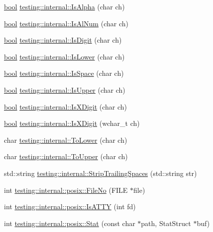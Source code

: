 \begin{DoxyCompactItemize}
\item 
\hyperlink{classbool}{bool} \hyperlink{namespacetesting_1_1internal_aeb957087fd6bbf9db98ab7cd41b0c129}{testing\+::internal\+::\+Is\+Alpha} (char ch)
\item 
\hyperlink{classbool}{bool} \hyperlink{namespacetesting_1_1internal_a83802e7f23324cd512232203662e1a98}{testing\+::internal\+::\+Is\+Al\+Num} (char ch)
\item 
\hyperlink{classbool}{bool} \hyperlink{namespacetesting_1_1internal_a4bd96b7fa6486802d33ddc217af55a39}{testing\+::internal\+::\+Is\+Digit} (char ch)
\item 
\hyperlink{classbool}{bool} \hyperlink{namespacetesting_1_1internal_ac26ce3883bc8919c27074975e958f3b7}{testing\+::internal\+::\+Is\+Lower} (char ch)
\item 
\hyperlink{classbool}{bool} \hyperlink{namespacetesting_1_1internal_af429e04f70f9c10f6aa76a5d1ccd389f}{testing\+::internal\+::\+Is\+Space} (char ch)
\item 
\hyperlink{classbool}{bool} \hyperlink{namespacetesting_1_1internal_a84f3baa379fec6bf5947cb5165aa8cc9}{testing\+::internal\+::\+Is\+Upper} (char ch)
\item 
\hyperlink{classbool}{bool} \hyperlink{namespacetesting_1_1internal_aa234ef141278263fb143b616c74c86e7}{testing\+::internal\+::\+Is\+X\+Digit} (char ch)
\item 
\hyperlink{classbool}{bool} \hyperlink{namespacetesting_1_1internal_a6ab68a30f8291c09b2289c132bbe3b16}{testing\+::internal\+::\+Is\+X\+Digit} (wchar\+\_\+t ch)
\item 
char \hyperlink{namespacetesting_1_1internal_ad9c627ef2a94245e3fd69e7ab3d49b42}{testing\+::internal\+::\+To\+Lower} (char ch)
\item 
char \hyperlink{namespacetesting_1_1internal_ac1b876a8133895bd553d4780ecaa1e3a}{testing\+::internal\+::\+To\+Upper} (char ch)
\item 
std\+::string \hyperlink{namespacetesting_1_1internal_aa6afda12e567c353e2e9b9c2e8cae14f}{testing\+::internal\+::\+Strip\+Trailing\+Spaces} (std\+::string str)
\item 
int \hyperlink{namespacetesting_1_1internal_1_1posix_a3117b067e1f942a2031e666953120ccc}{testing\+::internal\+::posix\+::\+File\+No} (F\+I\+LE $\ast$file)
\item 
int \hyperlink{namespacetesting_1_1internal_1_1posix_a16ebe936b3a8ea462a94191635aedc27}{testing\+::internal\+::posix\+::\+Is\+A\+T\+TY} (int fd)
\item 
int \hyperlink{namespacetesting_1_1internal_1_1posix_a2b87b7ff647a128614daf50667eb9304}{testing\+::internal\+::posix\+::\+Stat} (const char $\ast$path, Stat\+Struct $\ast$buf)

\end{DoxyCompactItemize}
